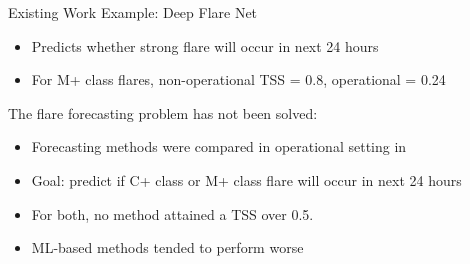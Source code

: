 \documentclass{beamer}
\begin{document}
\begin{frame}{Existing Work} %
    Example: Deep Flare Net \cite{nishizuka2018deep, nishizuka2021oper}
    \begin{itemize}
        \item Predicts whether strong flare will occur in next 24 hours
        \item For M+ class flares, non-operational TSS = 0.8, operational = 0.24
    \end{itemize}    
    The flare forecasting problem has not been solved:
    \begin{itemize}
        \item Forecasting methods were compared in operational setting in \cite{leka2019acomII, leka2019acomIII}
        \item Goal: predict if C+ class or M+ class flare will occur in next 24 hours
        \item For both, no method attained a TSS over 0.5.
        \item ML-based methods tended to perform worse
    \end{itemize}
\end{frame}
\end{document}
